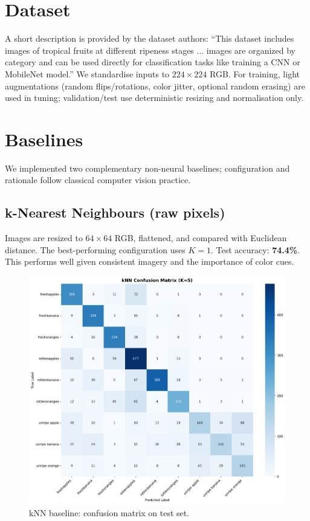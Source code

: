 \documentclass[11pt,a4paper]{article}
\begin{document}
\section{Dataset}
A short description is provided by the dataset authors:\newline
``This dataset includes images of tropical fruits at different ripeness stages ... images are organized by category and can be used directly for classification tasks like training a CNN or MobileNet model.''\newline
We standardise inputs to \(224\times224\) RGB. For training, light augmentations (random flips/rotations, color jitter, optional random erasing) are used in tuning; validation/test use deterministic resizing and normalisation only.

\section{Baselines}
We implemented two complementary non-neural baselines; configuration and rationale follow classical computer vision practice.

\subsection{k-Nearest Neighbours (raw pixels)}
Images are resized to \(64\times64\) RGB, flattened, and compared with Euclidean distance. The best-performing configuration uses \(K=1\). Test accuracy: \textbf{74.4\%}. This performs well given consistent imagery and the importance of color cues.

\begin{figure}[H]
  \centering
  \includegraphics[width=0.7\linewidth]{baseline_knn_confusion_matrix.png}
  \caption{kNN baseline: confusion matrix on test set.}
  \label{fig:knn-conf}
\end{figure}
\end{document}

